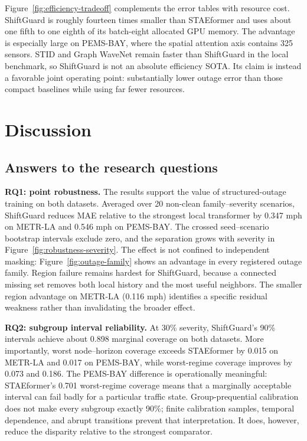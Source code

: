 \documentclass[pdflatex,sn-mathphys-num]{sn-jnl}
\begin{document}
Figure~\ref{fig:efficiency-tradeoff} complements the error tables with resource
cost. ShiftGuard is roughly fourteen times smaller than STAEformer and uses
about one fifth to one eighth of its batch-eight allocated GPU memory. The
advantage is especially large on PEMS-BAY, where the spatial attention axis
contains 325 sensors. STID and Graph WaveNet remain faster than ShiftGuard in
the local benchmark, so ShiftGuard is not an absolute efficiency SOTA. Its
claim is instead a favorable joint operating point: substantially lower outage
error than those compact baselines while using far fewer resources.

\section{Discussion}
\subsection{Answers to the research questions}
\textbf{RQ1: point robustness.} The results support the value of
structured-outage training on both datasets. Averaged over 20 non-clean
family--severity scenarios, ShiftGuard reduces MAE relative to the strongest
local transformer by 0.347 mph on METR-LA and 0.546 mph on PEMS-BAY. The crossed
seed--scenario bootstrap intervals exclude zero, and the separation grows with
severity in Figure~\ref{fig:robustness-severity}. The effect is not confined to
independent masking: Figure~\ref{fig:outage-family} shows an advantage in every
registered outage family. Region failure remains hardest for ShiftGuard,
because a connected missing set removes both local history and the most useful
neighbors. The smaller region advantage on METR-LA (0.116 mph) identifies a
specific residual weakness rather than invalidating the broader effect.

\textbf{RQ2: subgroup interval reliability.} At 30\% severity, ShiftGuard's
90\% intervals achieve about 0.898 marginal coverage on both datasets. More
importantly, worst node--horizon coverage exceeds STAEformer by 0.015 on
METR-LA and 0.017 on PEMS-BAY, while worst-regime coverage improves by 0.073 and
0.186. The PEMS-BAY difference is operationally meaningful: STAEformer's
0.701 worst-regime coverage means that a marginally acceptable interval can
fail badly for a particular traffic state. Group-prequential calibration does
not make every subgroup exactly 90\%; finite calibration samples, temporal
dependence, and abrupt transitions prevent that interpretation. It does,
however, reduce the disparity relative to the strongest comparator.
\end{document}
